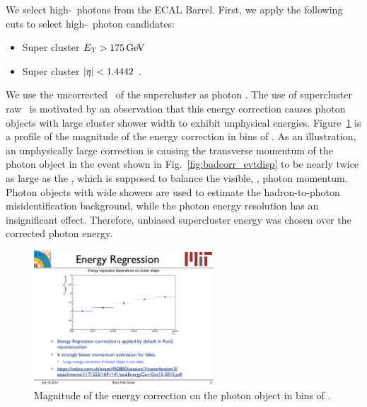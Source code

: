 We select high-\ET\ photons from the ECAL Barrel. First, we apply the following cuts to select high-\ET\ photon candidates:
\begin{itemize}
\item Super cluster $E_{\mathrm{T}} > 175\,\text{Ge\hspace{-.08em}V}$
\item Super cluster $\lvert \eta \rvert < 1.4442$ .
\end{itemize}
We use the uncorrected \ET\ of the supercluster as photon \ET. 
The use of supercluster raw \ET\ is motivated by an observation that this energy correction causes photon objects with large cluster shower width to exhibit unphysical energies. 
Figure~\ref{fig:corr_vs_sieie} is a profile of the magnitude of the energy correction in bins of \sieie. 
As an illustration, an unphysically large correction is causing the transverse momentum of the photon object in the event shown in Fig.~\ref{fig:badcorr_evtdisp} to be nearly twice as large as the \met, which is supposed to balance the visible, \ie, photon momentum. 
Photon objects with wide showers are used to estimate the hadron-to-photon misidentification background, while the photon energy resolution has an insignificant effect. 
Therefore, unbiased supercluster energy was chosen over the corrected photon energy.

\begin{figure}[htbp]
  \begin{center}
    \includegraphics[width=0.6\textwidth]{Reconstruction/Figures/corr_vs_sieie.pdf}
    \caption{
      Magnitude of the energy correction on the photon object in bins of \sieie.
    }
    \label{fig:corr_vs_sieie}
  \end{center}
\end{figure}

